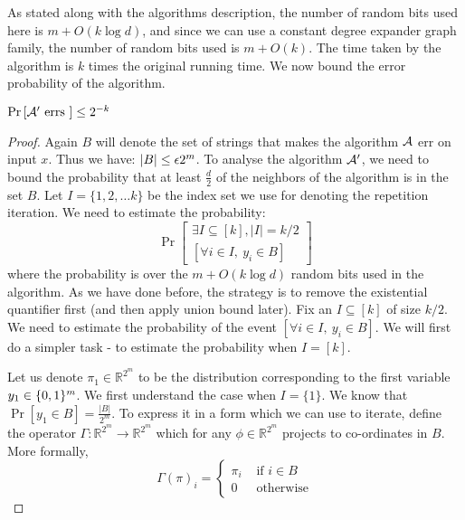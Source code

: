 As stated along with the algorithms description, the number of random bits used here is $m+O(k \log d)$, and since we can use a constant degree expander graph family, the number of random bits used is $m+O(k)$. The time taken by the algorithm is $k$ times the original running time. We now bound the error probability of the algorithm.

\begin{lemma}
\label{lem:expwalk-amplification-bound}
$\Pr\left[{\cal A}' \textrm{ errs }\right] \le 2^{-k}$
\end{lemma}

\begin{proof}
Again $B$ will denote the set of strings that makes the algorithm ${\cal A}$ err on input $x$. Thus we have: $\left|B \right| \le \epsilon 2^m$. To analyse the algorithm ${\cal A}'$, we need to bound the probability that at least $\frac{d}{2}$ of the neighbors of the algorithm is in the set $B$. Let $I = \{1,2,\ldots k\}$ be the index set we use for denoting the repetition iteration. We need to estimate the probability:
$$\Pr\left[ \begin{array}{c}
\exists I \subseteq [k], |I|=k/2 \\
\left[ \forall i \in I,~y_i \in B \right]
\end{array}
\right]
$$
where the probability is over the $m+O(k\log d)$ random bits used in the algorithm. As we have done before, the strategy is to remove the existential quantifier first (and then apply union bound later). Fix an $I \subseteq [k]$ of size $k/2$. We need to estimate the probability of the event $\left[ \forall i \in I,~y_i \in B \right]$. We will first do a simpler task - to estimate the probability when $I=[k]$.

Let us denote $\pi_1 \in \mathbb{R}^{2^m}$ to be the distribution corresponding to the first variable $y_1 \in \{0,1\}^m$. We first understand the case when $I = \{1\}$. We know that $\Pr[y_1 \in B] = \frac{|B|}{2^m}$. To express it in a form which we can use to iterate, define the operator $\Gamma : \mathbb{R}^{2^m} \to \mathbb{R}^{2^m}$ which for any $\phi \in \mathbb{R}^{2^m}$ projects to co-ordinates in $B$. More formally,
\[
\Gamma(\pi)_i = \left\{
\begin{array}{ll}
\pi_i & \textrm{ if $i \in B$} \\
0 & \textrm{ otherwise}
\end{array}
\right.
\]


\end{proof}
